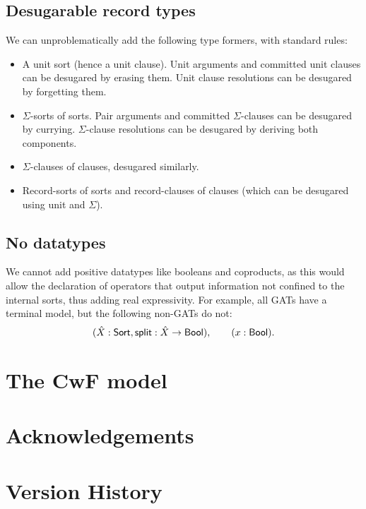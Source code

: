 \documentclass[a4paper]{article}
\begin{document}
\subsection{Desugarable record types}
We can unproblematically add the following type formers, with standard rules:
\begin{itemize}[noitemsep]
	\item A unit sort (hence a unit clause). Unit arguments and committed unit clauses can be desugared by erasing them. Unit clause resolutions can be desugared by forgetting them.
	\item $\Sigma$-sorts of sorts. Pair arguments and committed $\Sigma$-clauses can be desugared by currying. $\Sigma$-clause resolutions can be desugared by deriving both components.
	\item $\Sigma$-clauses of clauses, desugared similarly.
	\item Record-sorts of sorts and record-clauses of clauses (which can be desugared using unit and $\Sigma$).
\end{itemize}

\subsection{No datatypes}
We cannot add positive datatypes like booleans and coproducts, as this would allow the declaration of operators that output information not confined to the internal sorts, thus adding real expressivity. For example, all GATs have a terminal model, but the following non-GATs do not:
\[
	(\hat X : {\mathsf{Sort}}, \mathsf{split} : \hat X \to {\mathsf{Bool}}), \qquad
	(x : {\mathsf{Bool}}).
\]

\section{The CwF model}

\section*{Acknowledgements}

\appendix
\section{Version History}



\end{document}
